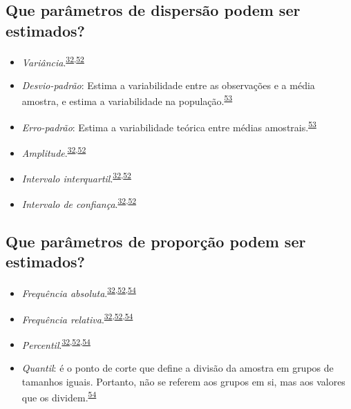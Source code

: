\documentclass[
]{book}
\begin{document}
\hypertarget{que-paruxe2metros-de-dispersuxe3o-podem-ser-estimados}{%
\subsection{Que parâmetros de dispersão podem ser estimados?}\label{que-paruxe2metros-de-dispersuxe3o-podem-ser-estimados}}

\begin{itemize}
\item
  \emph{Variância}.\textsuperscript{\protect\hyperlink{ref-Ali2016}{32},\protect\hyperlink{ref-kanji2006}{52}}
\item
  \emph{Desvio-padrão}: Estima a variabilidade entre as observações e a média amostra, e estima a variabilidade na população.\textsuperscript{\protect\hyperlink{ref-Curran-Everett2008}{53}}
\item
  \emph{Erro-padrão}: Estima a variabilidade teórica entre médias amostrais.\textsuperscript{\protect\hyperlink{ref-Curran-Everett2008}{53}}
\item
  \emph{Amplitude}.\textsuperscript{\protect\hyperlink{ref-Ali2016}{32},\protect\hyperlink{ref-kanji2006}{52}}
\item
  \emph{Intervalo interquartil}.\textsuperscript{\protect\hyperlink{ref-Ali2016}{32},\protect\hyperlink{ref-kanji2006}{52}}
\item
  \emph{Intervalo de confiança}.\textsuperscript{\protect\hyperlink{ref-Ali2016}{32},\protect\hyperlink{ref-kanji2006}{52}}
\end{itemize}

\hypertarget{que-paruxe2metros-de-proporuxe7uxe3o-podem-ser-estimados}{%
\subsection{Que parâmetros de proporção podem ser estimados?}\label{que-paruxe2metros-de-proporuxe7uxe3o-podem-ser-estimados}}

\begin{itemize}
\item
  \emph{Frequência absoluta}.\textsuperscript{\protect\hyperlink{ref-Ali2016}{32},\protect\hyperlink{ref-kanji2006}{52},\protect\hyperlink{ref-Altman1994}{54}}
\item
  \emph{Frequência relativa}.\textsuperscript{\protect\hyperlink{ref-Ali2016}{32},\protect\hyperlink{ref-kanji2006}{52},\protect\hyperlink{ref-Altman1994}{54}}
\item
  \emph{Percentil}.\textsuperscript{\protect\hyperlink{ref-Ali2016}{32},\protect\hyperlink{ref-kanji2006}{52},\protect\hyperlink{ref-Altman1994}{54}}
\item
  \emph{Quantil}: é o ponto de corte que define a divisão da amostra em grupos de tamanhos iguais. Portanto, não se referem aos grupos em si, mas aos valores que os dividem.\textsuperscript{\protect\hyperlink{ref-Altman1994}{54}}
\end{itemize}
\end{document}
